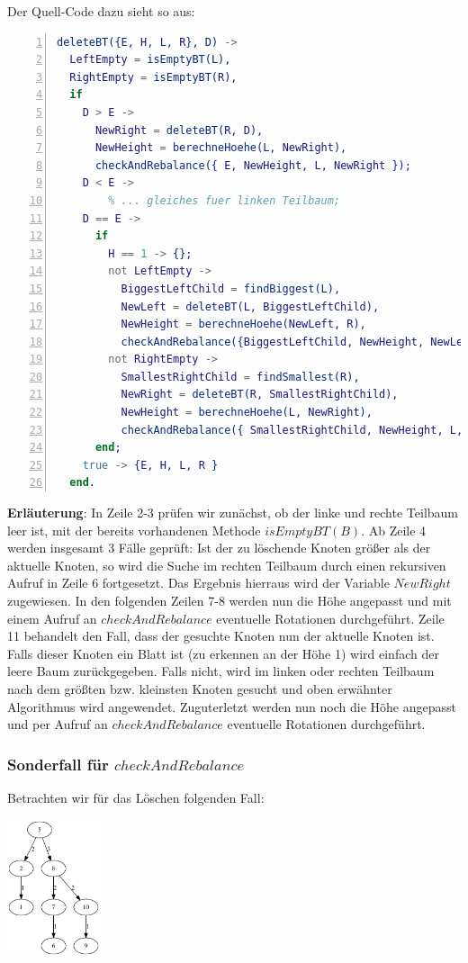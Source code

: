 \documentclass{article}
\begin{document}
	Der Quell-Code dazu sieht so aus:\newline
	
\begin{lstlisting}[language=erlang,numbers=left]
deleteBT({E, H, L, R}, D) ->
  LeftEmpty = isEmptyBT(L),
  RightEmpty = isEmptyBT(R),
  if
    D > E -> 
      NewRight = deleteBT(R, D),
      NewHeight = berechneHoehe(L, NewRight),
      checkAndRebalance({ E, NewHeight, L, NewRight });
    D < E ->
    	% ... gleiches fuer linken Teilbaum;
    D == E ->
      if
        H == 1 -> {};
        not LeftEmpty ->
          BiggestLeftChild = findBiggest(L),
          NewLeft = deleteBT(L, BiggestLeftChild),
          NewHeight = berechneHoehe(NewLeft, R),
          checkAndRebalance({BiggestLeftChild, NewHeight, NewLeft, R});
        not RightEmpty ->
          SmallestRightChild = findSmallest(R),
          NewRight = deleteBT(R, SmallestRightChild),
          NewHeight = berechneHoehe(L, NewRight),
          checkAndRebalance({ SmallestRightChild, NewHeight, L, NewRight })
      end;
    true -> {E, H, L, R }
  end.
\end{lstlisting}

	\textbf{Erläuterung}: In Zeile 2-3 prüfen wir zunächst, ob der linke und rechte Teilbaum leer ist, mit der bereits vorhandenen Methode $isEmptyBT(B)$. Ab Zeile 4 werden insgesamt 3 Fälle geprüft: Ist der zu löschende Knoten größer als der aktuelle Knoten, so wird die Suche im rechten Teilbaum durch einen rekursiven Aufruf in Zeile 6 fortgesetzt. Das Ergebnis hierraus wird der Variable $NewRight$ zugewiesen. In den folgenden Zeilen 7-8 werden nun die Höhe angepasst und mit einem Aufruf an $checkAndRebalance$ eventuelle Rotationen durchgeführt. Zeile 11 behandelt den Fall, dass der gesuchte Knoten nun der aktuelle Knoten ist. Falls dieser Knoten ein Blatt ist (zu erkennen an der Höhe 1) wird einfach der leere Baum zurückgegeben. Falls nicht, wird im linken oder rechten Teilbaum nach dem größten bzw. kleinsten Knoten gesucht und oben erwähnter Algorithmus wird angewendet. Zuguterletzt werden nun noch die Höhe angepasst und per Aufruf an $checkAndRebalance$ eventuelle Rotationen durchgeführt.
	
	\subsubsection{Sonderfall für $checkAndRebalance$}
	
	Betrachten wir für das Löschen folgenden Fall:
	
	\begin{center}
   	\includegraphics[height=4cm]{3.png}
	\end{center}
	
\end{document}
